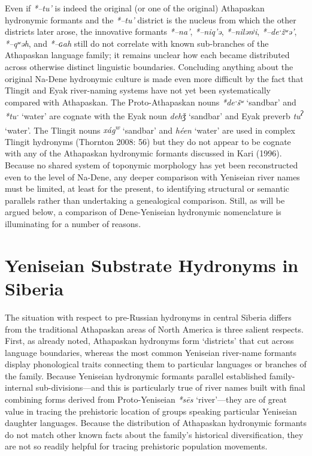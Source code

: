 Even if \textit{*–tu’} is indeed the original (or one of the original) Athapaskan hydronymic formants and the \textit{*–tu’} district is the nucleus from which the other districts later arose, the innovative formants \textit{*–na’}, \textit{*–niq’ə}, \textit{*–nilənʲi}, \textit{*–deˑžʷə’}, \textit{*–qʷəh}, and \textit{*–ɢah} still do not correlate with known sub-branches of the Athapaskan language family; it remains unclear how each became distributed across otherwise distinct linguistic boundaries. Concluding anything about the original Na-Dene hydronymic culture is made even more difficult by the fact that Tlingit and Eyak river-naming systems have not yet been systematically compared with Athapaskan. The Proto-Athapaskan nouns \textit{*deˑšʷ} ‘sandbar’ and \textit{*tuˑ} ‘water’ are cognate with the Eyak noun \textit{dehǯ }‘sandbar’ and Eyak preverb \textit{tu\textsuperscript{ʔ}}\textit{ }‘water’. The Tlingit nouns \textit{xág}\textit{\textsuperscript{w}} ‘sandbar’ and\textit{ héen} ‘water’ are used in complex Tlingit hydronyms (Thornton 2008: 56) but they do not appear to be cognate with any of the Athapaskan hydronymic formants discussed in Kari (1996). Because no shared system of toponymic morphology has yet been reconstructed even to the level of Na-Dene, any deeper comparison with Yeniseian river names must be limited, at least for the present, to identifying structural or semantic parallels rather than undertaking a genealogical comparison. Still, as will be argued below, a comparison of Dene-Yeniseian hydronymic nomenclature is illuminating for a number of reasons.

\section{Yeniseian Substrate Hydronyms in Siberia}\label{vajda:sec:2}


The situation with respect to pre-Russian hydronyms in central Siberia differs from the traditional Athapaskan areas of North America is three salient respects. First, as already noted, Athapaskan hydronyms form ‘districts’ that cut across language boundaries, whereas the most common Yeniseian river-name formants display phonological traits connecting them to particular languages or branches of the family. Because Yeniseian hydronymic formants parallel established family-internal sub-divisions---and this is particularly true of river names built with final combining forms derived from Proto-Yeniseian \textit{*s\=es} ‘river’---they are of great value in tracing the prehistoric location of groups speaking particular Yeniseian daughter languages. Because the distribution of Athapaskan hydronymic formants do not match other known facts about the family’s historical diversification, they are not so readily helpful for tracing prehistoric population movements.

